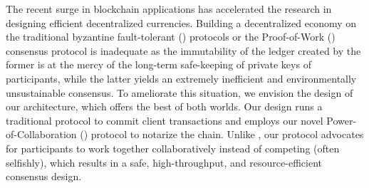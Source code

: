 The recent surge in blockchain applications has accelerated the research in 
designing efficient decentralized currencies. Building a decentralized economy 
on the traditional byzantine fault-tolerant (\BFT{}) protocols or the Proof-of-Work 
(\PoW{}) consensus protocol is inadequate as the immutability of the ledger created 
by the former is at the mercy of the long-term safe-keeping of private keys of 
participants, while the latter yields an extremely inefficient and environmentally 
unsustainable consensus. To ameliorate this situation, we envision the design of 
our \DualChain{} architecture, which offers the best of both worlds. Our \DualChain{} 
design runs a traditional \BFT{} protocol to commit client transactions and employs 
our novel Power-of-Collaboration (\PoC{}) protocol to notarize the \BFT{} chain. 
Unlike \PoW{}, our \PoC{} protocol advocates for participants to work together 
collaboratively instead of competing (often selfishly), which results in a 
safe, high-throughput, and resource-efficient consensus design.

